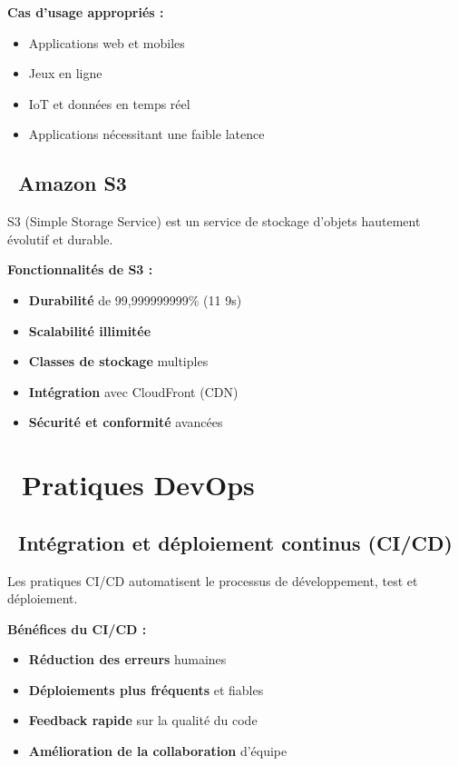 \textbf{\color{primaryblue}Cas d'usage appropriés :}
\begin{itemize}
    \item Applications web et mobiles
    \item Jeux en ligne
    \item IoT et données en temps réel
    \item Applications nécessitant une faible latence
\end{itemize}

\subsection{\faHdd\ Amazon S3}

S3 (Simple Storage Service) est un service de stockage d'objets hautement évolutif et durable.

\textbf{\color{primaryblue}Fonctionnalités de S3 :}
\begin{itemize}
    \item \textcolor{accentgreen}{\textbf{Durabilité}} de 99,999999999\% (11 9s)
    \item \textcolor{accentgreen}{\textbf{Scalabilité illimitée}}
    \item \textcolor{accentgreen}{\textbf{Classes de stockage}} multiples
    \item \textcolor{accentgreen}{\textbf{Intégration}} avec CloudFront (CDN)
    \item \textcolor{accentgreen}{\textbf{Sécurité et conformité}} avancées
\end{itemize}

\section{\faCogs\ Pratiques DevOps}

\subsection{\faInfinity\ Intégration et déploiement continus (CI/CD)}

\begin{infobox}
Les pratiques CI/CD automatisent le processus de développement, test et déploiement.
\end{infobox}

\textbf{\color{primaryblue}Bénéfices du CI/CD :}
\begin{itemize}
    \item \textcolor{accentgreen}{\textbf{Réduction des erreurs}} humaines
    \item \textcolor{accentgreen}{\textbf{Déploiements plus fréquents}} et fiables
    \item \textcolor{accentgreen}{\textbf{Feedback rapide}} sur la qualité du code
    \item \textcolor{accentgreen}{\textbf{Amélioration de la collaboration}} d'équipe
\end{itemize}

